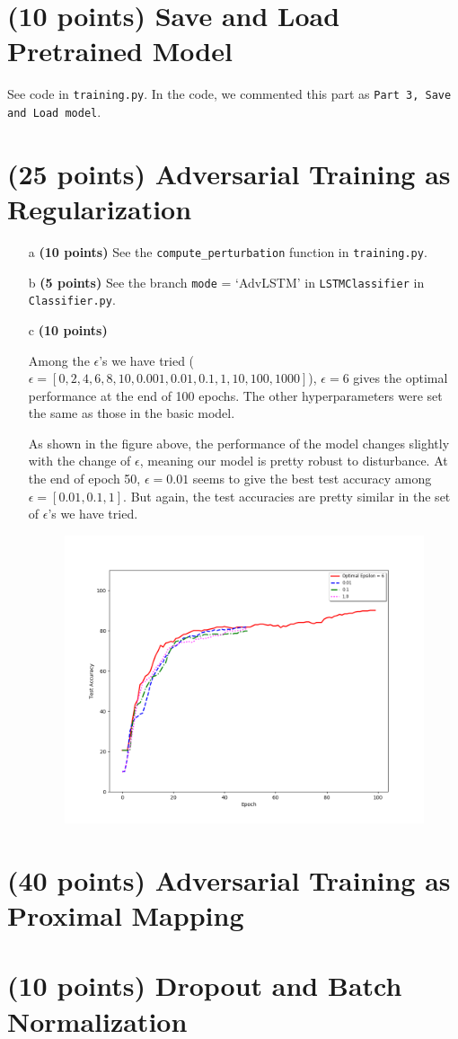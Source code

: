 \documentclass[11pt]{report}
\begin{document}
\section{(10 points)  Save and Load Pretrained Model}

See code in \texttt{training.py}. In the code, we commented this part as \texttt{Part 3, Save and Load model}.  

\section{(25 points) Adversarial Training as Regularization}
\begin{itemize}
    \item[a] \textbf{(10 points)} See the \texttt{compute\_perturbation} function in \texttt{training.py}.
    \item[b] \textbf{(5 points)} See the branch \texttt{mode} = `AdvLSTM' in \texttt{LSTMClassifier} in \texttt{Classifier.py}.
    \item[c] \textbf{(10 points)} 

    Among the $\epsilon$'s we have tried ($\epsilon = [0, 2, 4, 6, 8, 10, 0.001, 0.01, 0.1, 1, 10, 100, 1000]$), $\epsilon = 6$ gives the optimal performance at the end of 100 epochs. The other hyperparameters were set the same as those in the basic model. 

    As shown in the figure above, the performance of the model changes slightly with the change of $\epsilon$, meaning our model is pretty robust to disturbance. 
    At the end of epoch 50, $\epsilon = 0.01$ seems to give the best test accuracy among $\epsilon = [0.01, 0.1, 1]$. 
    But again, the test accuracies are pretty similar in the set of $\epsilon$'s we have tried.    

    \begin{figure}[h]
    	\includegraphics[width = 15 cm]{AdvModel.png}
    	\centering
	\end{figure}

\end{itemize}

	


\section{(40 points) Adversarial Training as Proximal Mapping}

\section{(10 points) Dropout and Batch Normalization}
\end{document}
